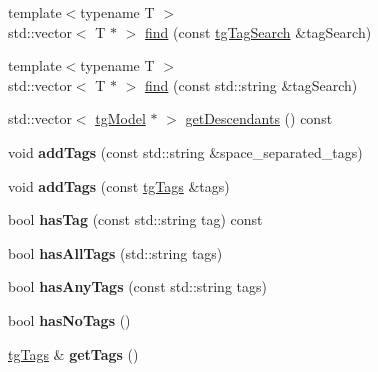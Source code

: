 \begin{DoxyCompactItemize}
{\footnotesize template$<$typename T $>$ }\\std\-::vector$<$ T $\ast$ $>$ \hyperlink{classtg_model_ab75836fdfbd9200f165c3b28a19630c0}{find} (const \hyperlink{classtg_tag_search}{tg\-Tag\-Search} \&tag\-Search)
\item 
{\footnotesize template$<$typename T $>$ }\\std\-::vector$<$ T $\ast$ $>$ \hyperlink{classtg_model_aa40b5fb32f8941e04d537f4e6c6db35c}{find} (const std\-::string \&tag\-Search)
\item 
std\-::vector$<$ \hyperlink{classtg_model}{tg\-Model} $\ast$ $>$ \hyperlink{classtg_model_a2efa4321fa5c77b4ce23b01f6fd3a1c4}{get\-Descendants} () const 
\item 
\hypertarget{classtg_taggable_af0b8f1729653b0b90d2fecbd51163612}{void {\bfseries add\-Tags} (const std\-::string \&space\-\_\-separated\-\_\-tags)}\label{classtg_taggable_af0b8f1729653b0b90d2fecbd51163612}

\item 
\hypertarget{classtg_taggable_af28e3fe1a7e4eb28772dc006d575dd1f}{void {\bfseries add\-Tags} (const \hyperlink{classtg_tags}{tg\-Tags} \&tags)}\label{classtg_taggable_af28e3fe1a7e4eb28772dc006d575dd1f}

\item 
\hypertarget{classtg_taggable_ae31f65869c8887bfeb34a344902c4d5b}{bool {\bfseries has\-Tag} (const std\-::string tag) const }\label{classtg_taggable_ae31f65869c8887bfeb34a344902c4d5b}

\item 
\hypertarget{classtg_taggable_a33b77b1075171b63f673965687b2e844}{bool {\bfseries has\-All\-Tags} (std\-::string tags)}\label{classtg_taggable_a33b77b1075171b63f673965687b2e844}

\item 
\hypertarget{classtg_taggable_af14af28fa98021c4f20a5e8f2ddd5606}{bool {\bfseries has\-Any\-Tags} (const std\-::string tags)}\label{classtg_taggable_af14af28fa98021c4f20a5e8f2ddd5606}

\item 
\hypertarget{classtg_taggable_adff345e116e16420c701a748ff8f995f}{bool {\bfseries has\-No\-Tags} ()}\label{classtg_taggable_adff345e116e16420c701a748ff8f995f}

\item 
\hypertarget{classtg_taggable_acf1d7fa9df8f374f25015c4080902681}{\hyperlink{classtg_tags}{tg\-Tags} \& {\bfseries get\-Tags} ()}\label{classtg_taggable_acf1d7fa9df8f374f25015c4080902681}


\end{DoxyCompactItemize}
